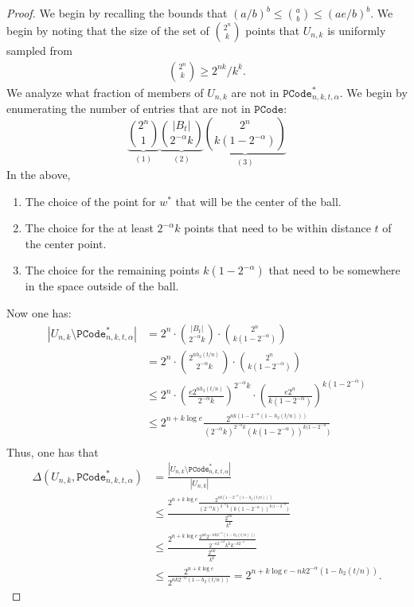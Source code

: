  \begin{proof} We begin by recalling the bounds that $(a/b)^b \le {a\choose b} \le (ae/b)^b$.
 We begin by noting that the size of the set of ${2^n \choose k}$ points that $U_{n,k}$ is uniformly sampled from
 \begin{align*}
 {2^n\choose k} \ge 2^{nk}/k^k.
 \end{align*}  We analyze what fraction of members of $U_{n,k}$ are not in $\mathtt{PCode}_{n, k, t, \alpha}^{*}$.
 We begin by enumerating the number of entries that are not in $\mathtt{PCode}$:
 \[
  \underbrace{{2^n \choose 1}}_{(1)}  \underbrace{{|B_t| \choose 2^{-\alpha}k}}_{(2)}   \underbrace{{2^n \choose k(1-2^{-\alpha})}}_{(3)}
 \]
 In the above, 
 \begin{enumerate}
 \itemsep0em
 \item The choice of the point for $w^*$ that will be the center of the ball.
 \item The choice for the at least $2^{-\alpha} k$ points that need to be within distance $t$ of the center point.
 \item The choice for the remaining points $k(1-2^{-\alpha})$ that need to be somewhere in the space outside of the ball.  
 \end{enumerate}
 Now one has: 
 \begin{align*}
|U_{n, k} \setminus \mathtt{PCode}_{n, k, t, \alpha}^{*}|  &=2^n \cdot {|B_t| \choose 2^{-\alpha}k}\cdot {2^n \choose k(1-2^{-\alpha})}\\
&= 2^n \cdot {2^{nh_2(t/n)} \choose 2^{-\alpha}k}\cdot {2^n \choose k(1-2^{-\alpha})}\\
&\le 2^n \cdot \left(\frac{e2^{nh_2(t/n)}}{2^{-\alpha}k}\right)^{2^{-\alpha}k}\cdot \left(\frac{e2^n}{k(1-2^{-\alpha})}\right)^{k(1-2^{-\alpha})}\\
&\le 2^{n+k\log e} \frac{2^{nk(1-2^{-\alpha}(1-h_2(t/n)))}}{(2^{-\alpha}k)^{2^{-\alpha}k} (k(1-2^{-\alpha}))^{k(1-2^{-\alpha}})}\\
 \end{align*}
 Thus, one has that 
 \begin{align*}
\Delta(U_{n,k}, \mathtt{PCode}_{n, k, t, \alpha}^{*}) &= \frac{|U_{n, k} \setminus \mathtt{PCode}_{n, k, t, \alpha}^{*}|}{|U_{n, k}|}\\
&\le\frac{2^{n+k\log e} \frac{2^{nk(1-2^{-\alpha}(1-h_2(t/n)))}}{(2^{-\alpha}k)^{2^{-\alpha}k} (k(1-2^{-\alpha}))^{k(1-2^{-\alpha}})}}{\frac{2^{nk}}{k^k}}\\
&\le\frac{2^{n+k\log e} \frac{2^{nk} 2^{-nk2^{-\alpha}(1-h_2(t/n)))}}{2^{-\alpha 2^{-\alpha k}}k^kk^{-k2^{-\alpha}}}}{\frac{2^{nk}}{k^k}}\\
&\le \frac{2^{n+k\log e}}{2^{nk2^{-\alpha}(1-h_2(t/n))}} = 2^{n+k\log e- nk2^{-\alpha}(1-h_2(t/n))}.
 \end{align*}
  \end{proof}
  
